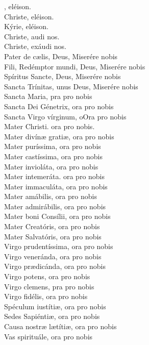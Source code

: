 \documentclass[9pt]{article}
\begin{document}
\begin{multicols*}{2}
    , eléison.\\
    Christe, eléison.\\
    Kýrie, eléison.\\
    Christe, audi nos.\\
    Christe, exáudi nos.\\
    Pater de cælis, Deus, Miserére nobis\\
    Fili, Redémptor mundi, Deus, Miserére nobis\\
    Spíritus Sancte, Deus, Miserére nobis\\
    Sancta Trínitas, unus Deus, Miserére nobis\\
    Sancta Maria, pra pro nobis\\
    Sancta Dei Génetrix, ora pro nobis\\
    Sancta Virgo vírginum, oOra pro nobis\\
    Mater Christi. ora pro nobis.\\
    Mater divín{\ae} gratiæ, ora pro nobis\\
    Mater puríssima, ora pro nobis\\
    Mater castíssima, ora pro nobis\\
    Mater invioláta, ora pro nobis\\
    Mater intemeráta. ora pro nobis\\
    Mater immaculáta, ora pro nobis\\
    Mater amábilis, ora pro nobis\\
    Mater admirábilis, ora pro nobis\\
    Mater boni Consílii, ora pro nobis\\
    Mater Creatóris, ora pro nobis\\
    Mater Salvatóris, ora pro nobis\\
    Virgo prudentíssima, ora pro nobis\\
    Virgo veneránda, ora pro nobis\\
    Virgo pr{\ae}dicánda, ora pro nobis\\
    Virgo potens, ora pro nobis\\
    Virgo clemens, pra pro nobis\\
    Virgo fidélis, ora pro nobis\\
    Spéculum iustítiæ, ora pro nobis\\
    Sedes Sapiéntiæ, ora pro nobis\\
    Causa nostræ l{\ae}títiæ, ora pro nobis\\
    Vas spirituále, ora pro nobis\\

\end{multicols*}
\end{document}
